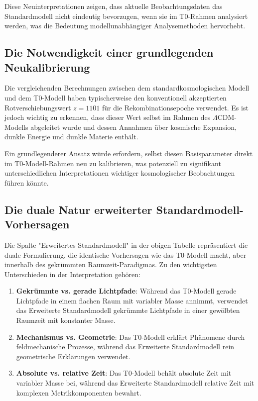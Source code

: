 \documentclass[12pt,a4paper]{article}
\begin{document}
	Diese Neuinterpretationen zeigen, dass aktuelle Beobachtungsdaten das Standardmodell nicht eindeutig bevorzugen, wenn sie im T0-Rahmen analysiert werden, was die Bedeutung modellunabhängiger Analysemethoden hervorhebt.
	
	\subsection{Die Notwendigkeit einer grundlegenden Neukalibrierung}
	
	Die vergleichenden Berechnungen zwischen dem standardkosmologischen Modell und dem T0-Modell haben typischerweise den konventionell akzeptierten Rotverschiebungswert $z = 1101$ für die Rekombinationsepoche verwendet. Es ist jedoch wichtig zu erkennen, dass dieser Wert selbst im Rahmen des $\Lambda$CDM-Modells abgeleitet wurde und dessen Annahmen über kosmische Expansion, dunkle Energie und dunkle Materie enthält.
	
	Ein grundlegenderer Ansatz würde erfordern, selbst diesen Basisparameter direkt im T0-Modell-Rahmen neu zu kalibrieren, was potenziell zu signifikant unterschiedlichen Interpretationen wichtiger kosmologischer Beobachtungen führen könnte.
	
	\subsection{Die duale Natur erweiterter Standardmodell-Vorhersagen}
	
	Die Spalte "Erweitertes Standardmodell" in der obigen Tabelle repräsentiert die duale Formulierung, die identische Vorhersagen wie das T0-Modell macht, aber innerhalb des gekrümmten Raumzeit-Paradigmas. Zu den wichtigsten Unterschieden in der Interpretation gehören:
	
	\begin{enumerate}
		\item \textbf{Gekrümmte vs. gerade Lichtpfade}: Während das T0-Modell gerade Lichtpfade in einem flachen Raum mit variabler Masse annimmt, verwendet das Erweiterte Standardmodell gekrümmte Lichtpfade in einer gewölbten Raumzeit mit konstanter Masse.
		\item \textbf{Mechanismus vs. Geometrie}: Das T0-Modell erklärt Phänomene durch feldmechanische Prozesse, während das Erweiterte Standardmodell rein geometrische Erklärungen verwendet.
		\item \textbf{Absolute vs. relative Zeit}: Das T0-Modell behält absolute Zeit mit variabler Masse bei, während das Erweiterte Standardmodell relative Zeit mit komplexen Metrikkomponenten bewahrt.
	\end{enumerate}
	
\end{document}
